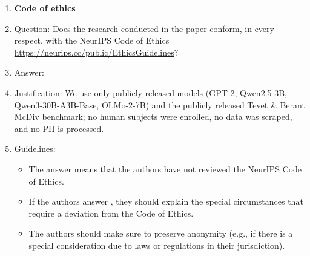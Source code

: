 \begin{enumerate}
\item {\bf Code of ethics}
    \item[] Question: Does the research conducted in the paper conform, in every respect, with the NeurIPS Code of Ethics \url{https://neurips.cc/public/EthicsGuidelines}?
    \item[] Answer: \answerYes{}
    \item[] Justification: We use only publicly released models (GPT-2, Qwen2.5-3B, Qwen3-30B-A3B-Base, OLMo-2-7B) and the publicly released Tevet \& Berant McDiv benchmark; no human subjects were enrolled, no data was scraped, and no PII is processed.
    \item[] Guidelines:
    \begin{itemize}
        \item The answer \answerNA{} means that the authors have not reviewed the NeurIPS Code of Ethics.
        \item If the authors answer \answerNo, they should explain the special circumstances that require a deviation from the Code of Ethics.
        \item The authors should make sure to preserve anonymity (e.g., if there is a special consideration due to laws or regulations in their jurisdiction).
    \end{itemize}



\end{enumerate}
